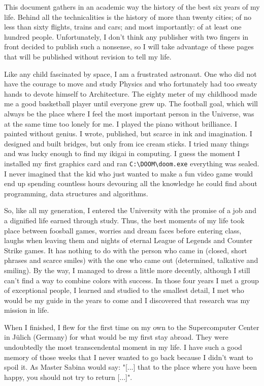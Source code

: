 This document gathers in an academic way the history of the best six years of my life. Behind all the technicalities is the history of more than twenty cities; of no less than sixty flights, trains and cars; and most importantly: of at least one hundred people. Unfortunately, I don't think any publisher with two fingers in front decided to publish such a nonsense, so I will take advantage of these pages that will be published without revision to tell my life.

Like any child fascinated by space, I am a frustrated astronaut. One who did not have the courage to move and study Physics and who fortunately had too sweaty hands to devote himself to Architecture. The eighty meter of my childhood made me a good basketball player until everyone grew up. The football goal, which will always be the place where I feel the most important person in the Universe, was at the same time too lonely for me. I played the piano without brilliance. I painted without genius. I wrote, published, but scarce in ink and imagination. I designed and built bridges, but only from ice cream sticks. I tried many things and was lucky enough to find my ikigai in computing. I guess the moment I installed my first graphics card and ran \verb|C:\DOOM\doom.exe| everything was sealed. I never imagined that the kid who just wanted to make a fun video game would end up spending countless hours devouring all the knowledge he could find about programming, data structures and algorithms.

So, like all my generation, I entered the University with the promise of a job and a dignified life earned through study. Thus, the best moments of my life took place between foosball games, worries and dream faces before entering class, laughs when leaving them and nights of eternal League of Legends and Counter Strike games. It has nothing to do with the person who came in (closed, short phrases and scarce smiles) with the one who came out (determined, talkative and smiling). By the way, I managed to dress a little more decently, although I still can't find a way to combine colors with success. In those four years I met a group of exceptional people, I learned and studied to the smallest detail, I met who would be my guide in the years to come and I discovered that research was my mission in life.

When I finished, I flew for the first time on my own to the Supercomputer Center in Jülich (Germany) for what would be my first stay abroad. They were undoubtedly the most transcendental moment in my life. I have such a good memory of those weeks that I never wanted to go back because I didn't want to spoil it. As Master Sabina would say: "[...] that to the place where you have been happy, you should not try to return [...]".

